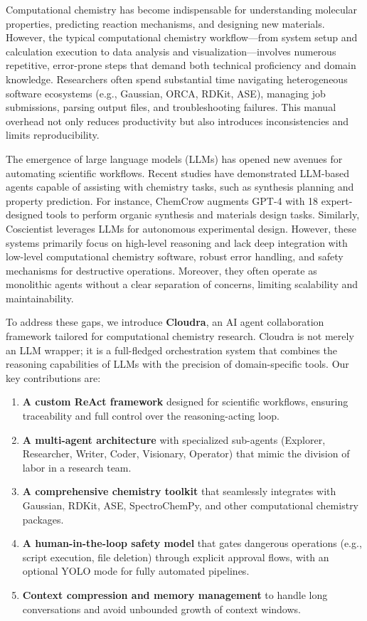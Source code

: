 Computational chemistry has become indispensable for understanding
molecular properties, predicting reaction mechanisms, and designing new
materials. However, the typical computational chemistry workflow---from
system setup and calculation execution to data analysis and
visualization---involves numerous repetitive, error-prone steps that
demand both technical proficiency and domain knowledge. Researchers
often spend substantial time navigating heterogeneous software
ecosystems (e.g., Gaussian, ORCA, RDKit, ASE), managing job submissions,
parsing output files, and troubleshooting failures. This manual overhead
not only reduces productivity but also introduces inconsistencies and
limits reproducibility.

The emergence of large language models (LLMs) has opened new avenues for
automating scientific workflows. Recent studies have demonstrated
LLM-based agents capable of assisting with chemistry tasks, such as
synthesis planning and property prediction. For instance, ChemCrow
augments GPT-4 with 18 expert-designed tools to perform organic
synthesis and materials design tasks. Similarly, Coscientist leverages
LLMs for autonomous experimental design. However, these systems
primarily focus on high-level reasoning and lack deep integration with
low-level computational chemistry software, robust error handling, and
safety mechanisms for destructive operations. Moreover, they often
operate as monolithic agents without a clear separation of concerns,
limiting scalability and maintainability.

To address these gaps, we introduce \textbf{Cloudra}, an AI agent
collaboration framework tailored for computational chemistry research.
Cloudra is not merely an LLM wrapper; it is a full-fledged orchestration
system that combines the reasoning capabilities of LLMs with the
precision of domain-specific tools. Our key contributions are:

\begin{enumerate}
\def\labelenumi{\arabic{enumi}.}
\tightlist
\item
  \textbf{A custom ReAct framework} designed for scientific workflows,
  ensuring traceability and full control over the reasoning-acting loop.
\item
  \textbf{A multi-agent architecture} with specialized sub-agents
  (Explorer, Researcher, Writer, Coder, Visionary, Operator) that mimic
  the division of labor in a research team.
\item
  \textbf{A comprehensive chemistry toolkit} that seamlessly integrates
  with Gaussian, RDKit, ASE, SpectroChemPy, and other computational
  chemistry packages.
\item
  \textbf{A human-in-the-loop safety model} that gates dangerous
  operations (e.g., script execution, file deletion) through explicit
  approval flows, with an optional YOLO mode for fully automated
  pipelines.
\item
  \textbf{Context compression and memory management} to handle long
  conversations and avoid unbounded growth of context windows.
\end{enumerate}

